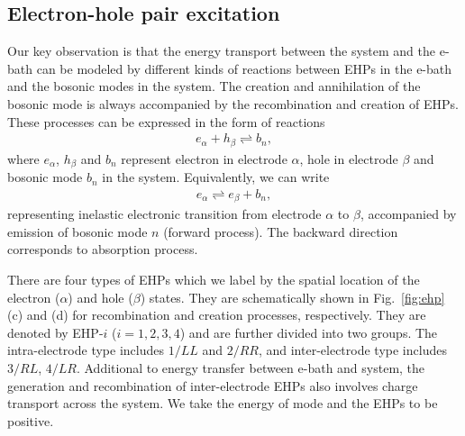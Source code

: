 \documentclass[aps,prb,
,floatfix,footinbib,shortbibliography,
preprint
]{revtex4-1}
\begin{document}




\subsection{Electron-hole pair excitation}
Our key observation is that the energy transport between the system and the e-bath can be modeled by different kinds of reactions between EHPs in the e-bath and the bosonic modes in the system. The creation and annihilation of the bosonic mode is always accompanied by the recombination and creation of EHPs. These processes can be expressed in the form of reactions
\begin{align}
e_\alpha + h_\beta \rightleftharpoons b_n,
\label{eq:reaction}
\end{align}
where $e_\alpha$, $h_\beta$ and $b_n$ represent electron in electrode $\alpha$, hole in electrode $\beta$ and bosonic mode $b_n$ in the system. Equivalently, we can write 
\begin{align}
e_\alpha \rightleftharpoons e_\beta + b_n,
\label{eq:reaction2}
\end{align}
representing inelastic electronic transition from electrode $\alpha$ to $\beta$, accompanied by emission of bosonic mode $n$ (forward process). The backward direction corresponds to absorption process.


There are four types of EHPs which we label by the spatial location of the electron ($\alpha$) and hole  ($\beta$) states. They are schematically shown in Fig.~\ref{fig:ehp} (c) and (d) for recombination and creation processes, respectively. They are denoted by EHP-$i$ ($i=1,2,3,4$) and are further divided into two groups. The intra-electrode type includes $1/LL$ and $2/RR$, and inter-electrode type includes $3/RL$, $4/LR$.  Additional to energy transfer between e-bath and system, the generation and recombination of inter-electrode EHPs also involves charge transport across the system. We take the energy of mode  and the EHPs to be positive. 
\end{document}
